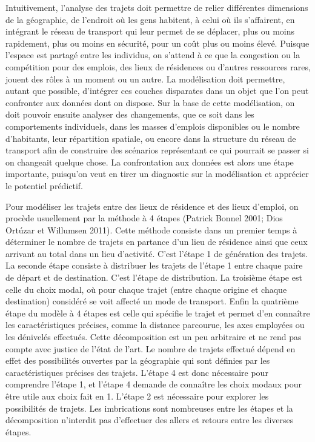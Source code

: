 \documentclass[
  10pt,
  a4paper,
  numbers=noendperiod,
  DIV=9]{scrreprt}
\begin{document}
Intuitivement, l'analyse des trajets doit permettre de relier
différentes dimensions de la géographie, de l'endroit où les gens
habitent, à celui où ils s'affairent, en intégrant le réseau de
transport qui leur permet de se déplacer, plus ou moins rapidement, plus
ou moins en sécurité, pour un coût plus ou moins élevé. Puisque l'espace
est partagé entre les individus, on s'attend à ce que la congestion ou
la compétition pour des emplois, des lieux de résidences ou d'autres
ressources rares, jouent des rôles à un moment ou un autre. La
modélisation doit permettre, autant que possible, d'intégrer ces couches
disparates dans un objet que l'on peut confronter aux données dont on
dispose. Sur la base de cette modélisation, on doit pouvoir ensuite
analyser des changements, que ce soit dans les comportements
individuels, dans les masses d'emplois disponibles ou le nombre
d'habitants, leur répartition spatiale, ou encore dans la structure du
réseau de transport afin de construire des scénarios représentant ce qui
pourrait se passer si on changeait quelque chose. La confrontation aux
données est alors une étape importante, puisqu'on veut en tirer un
diagnostic sur la modélisation et apprécier le potentiel prédictif.

Pour modéliser les trajets entre des lieux de résidence et des lieux
d'emploi, on procède usuellement par la méthode à 4 étapes (Patrick
Bonnel 2001; Dios Ortúzar et Willumsen 2011). Cette méthode consiste
dans un premier temps à déterminer le nombre de trajets en partance d'un
lieu de résidence ainsi que ceux arrivant au total dans un lieu
d'activité. C'est l'étape 1 de génération des trajets. La seconde étape
consiste à distribuer les trajets de l'étape 1 entre chaque paire de
départ et de destination. C'est l'étape de distribution. La troisième
étape est celle du choix modal, où pour chaque trajet (entre chaque
origine et chaque destination) considéré se voit affecté un mode de
transport. Enfin la quatrième étape du modèle à 4 étapes est celle qui
spécifie le trajet et permet d'en connaître les caractéristiques
précises, comme la distance parcourue, les axes employées ou les
dénivelés effectués. Cette décomposition est un peu arbitraire et ne
rend pas compte avec justice de l'état de l'art. Le nombre de trajets
effectué dépend en effet des possibilités ouvertes par la géographie qui
sont définies par les caractéristiques précises des trajets. L'étape 4
est donc nécessaire pour comprendre l'étape 1, et l'étape 4 demande de
connaître les choix modaux pour être utile aux choix fait en 1. L'étape
2 est nécessaire pour explorer les possibilités de trajets. Les
imbrications sont nombreuses entre les étapes et la décomposition
n'interdit pas d'effectuer des allers et retours entre les diverses
étapes.
\end{document}
